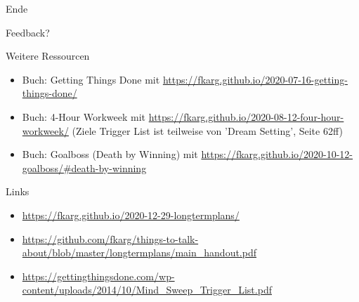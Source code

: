 
\begin{frame}[standout]
    \Huge
    Ende
\end{frame}


\begin{frame}[standout]
    \Huge
    Feedback?
\end{frame}


\appendix
\backupbegin


\begin{frame}[c]{Weitere Ressourcen}
    \begin{itemize}
        \item Buch: Getting Things Done \cite{gtd-book} mit \url{https://fkarg.github.io/2020-07-16-getting-things-done/}
        \item Buch: 4-Hour Workweek \cite{4h-workweek} mit \url{https://fkarg.github.io/2020-08-12-four-hour-workweek/} (Ziele Trigger List ist teilweise von 'Dream Setting', Seite 62ff)
        \item Buch: Goalboss \cite{goalboss} (Death by Winning) mit \url{https://fkarg.github.io/2020-10-12-goalboss/\#death-by-winning}
    \end{itemize}
\end{frame}


\begin{frame}[c]{Links}
    \begin{itemize}
        \item \url{https://fkarg.github.io/2020-12-29-longtermplans/}
        \item \url{https://github.com/fkarg/things-to-talk-about/blob/master/longtermplans/main_handout.pdf}
        \item \url{https://gettingthingsdone.com/wp-content/uploads/2014/10/Mind_Sweep_Trigger_List.pdf}
    \end{itemize}
\end{frame}


